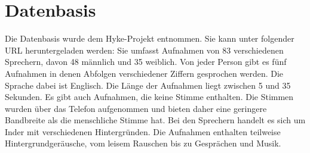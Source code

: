 \section{Datenbasis}
\label{database}
Die Datenbasis wurde dem Hyke-Projekt entnommen. Sie kann unter folgender URL heruntergeladen werden:
Sie umfasst Aufnahmen von 83 verschiedenen Sprechern, davon 48 männlich und 35 weiblich. Von jeder Person gibt es fünf Aufnahmen in denen Abfolgen verschiedener Ziffern gesprochen werden. Die Sprache dabei ist Englisch. Die Länge der Aufnahmen liegt zwischen 5 und 35 Sekunden. Es gibt auch Aufnahmen, die keine Stimme enthalten. %
Die Stimmen wurden über das Telefon aufgenommen und bieten daher eine geringere Bandbreite als die menschliche Stimme hat. Bei den Sprechern handelt es sich um Inder mit verschiedenen Hintergründen. Die Aufnahmen enthalten teilweise Hintergrundgeräusche, vom leisem Rauschen bis zu Gesprächen und Musik. 
